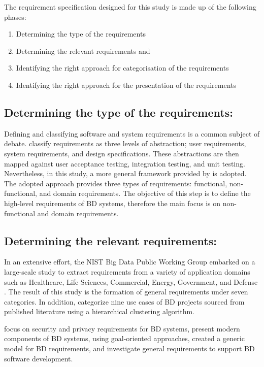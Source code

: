 \documentclass[preprint,12pt]{elsarticle}
\begin{document}
The requirement specification designed for this study is made up of the following phases: 

\begin{enumerate}
    \item Determining the type of the requirements 
    \item Determining the relevant requirements and 
    \item Identifying the right approach for categorisation of the requirements 
    \item Identifying the right approach for the presentation of the requirements 
\end{enumerate}

\subsection{Determining the type of the requirements:}

Defining and classifying software and system requirements is a common subject of debate. \citeauthor{sommerville2011software}\cite{sommerville2011software} classify requirements as three levels of abstraction; user requirements, system requirements, and design specifications. These abstractions are then mapped against user acceptance testing, integration testing, and unit testing. Nevertheless, in this study, a more general framework provided by \citeauthor{laplante2017requirements} is adopted. The adopted approach provides three types of requirements: functional, non-functional, and domain requirements. The objective of this step is to define the high-level requirements of BD systems, therefore the main focus is on non-functional and domain requirements. 

\subsection{Determining the relevant requirements:}

In an extensive effort, the NIST Big Data Public Working Group embarked on a large-scale study to extract requirements from a variety of application domains such as Healthcare, Life Sciences, Commercial, Energy, Government, and Defense \cite{Chang}. The result of this study is the formation of general requirements under seven categories. In addition, \citeauthor{volk2020identifying} categorize nine use cases of BD projects sourced from published literature using a hierarchical clustering algorithm. 

\citeauthor{AtaeiSecurity}\cite{AtaeiSecurity} focus on security and privacy requirements for BD systems, \citeauthor{yu2019components} present modern components of BD systems, using goal-oriented approaches, \citeauthor{eridaputra2014modeling} created a generic model for BD requirements, and  \citeauthor{al2016characteristics} investigate general requirements to support BD software development. 
\end{document}
